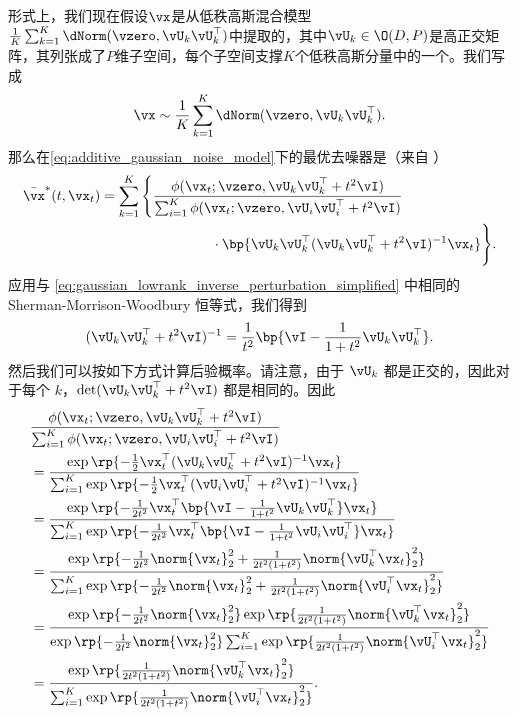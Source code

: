 \documentclass[../../book-main_zh.tex]{subfiles}
\begin{document}
形式上，我们现在假设\(\vx\)是从低秩高斯混合模型\(\frac{1}{K}\sum_{k = 1}^{K}\dNorm(\vzero,
\vU_{k}\vU_{k}^{\top})\)中提取的，其中\(\vU_{k} \in \O(D, P)\)是高正交矩阵，其列张成了\(P\)维子空间，每个子空间支撑\(K\)个低秩高斯分量中的一个。我们写成
\begin{equation}\label{eq:MoG1}
    \vx \sim \frac{1}{K}\sum_{k = 1}^{K}\dNorm(\vzero, \vU_{k}\vU_{k}^{\top}).
\end{equation}
那么在\eqref{eq:additive_gaussian_noise_model}下的最优去噪器是（来自
）
\begin{align}
    \bar{\vx}^{\ast}(t, \vx_{t})
    &= \sum_{k = 1}^{K}\Bigg\{\frac{\phi(\vx_{t} ; \vzero,
        \vU_{k}\vU_{k}^{\top} + t^{2}\vI)}{\sum_{i = 1}^{K}\phi(\vx_{t} ;
                \vzero, \vU_{i}\vU_{i}^{\top} +
        t^{2}\vI)} \\
        &\qquad \qquad \qquad \qquad
        \cdot\bp{\vU_{k}\vU_{k}^{\top}(\vU_{k}\vU_{k}^{\top} +
    t^{2}\vI)^{-1}\vx_{t}}\Bigg\}.
\end{align}
应用与 \eqref{eq:gaussian_lowrank_inverse_perturbation_simplified} 中相同的 Sherman-Morrison-Woodbury 恒等式，我们得到
\begin{equation}
    (\vU_{k}\vU_{k}^{\top} + t^{2}\vI)^{-1} = \frac{1}{t^{2}}\bp{\vI
    - \frac{1}{1 + t^{2}}\vU_{k}\vU_{k}^{\top}}.
\end{equation}
然后我们可以按如下方式计算后验概率。请注意，由于 \(\vU_{k}\) 都是正交的，因此对于每个 \(k\)，\(\det(\vU_{k}\vU_{k}^{\top}
+ t^{2}\vI)\) 都是相同的。因此
\begin{align}
    &\frac{\phi(\vx_{t} ; \vzero, \vU_{k}\vU_{k}^{\top} + t^{2}\vI)}{\sum_{i
    = 1}^{K}\phi(\vx_{t} ; \vzero, \vU_{i}\vU_{i}^{\top} + t^{2}\vI)} \\
    &= \frac{\exp\rp{-\frac{1}{2}\vx_{t}^{\top}(\vU_{k}\vU_{k}^{\top}
    + t^{2}\vI)^{-1}\vx_{t}}}{\sum_{i =
        1}^{K}\exp\rp{-\frac{1}{2}\vx_{t}^{\top}(\vU_{i}\vU_{i}^{\top} +
    t^{2}\vI)^{-1}\vx_{t}}} \\
    &= \frac{\exp\rp{-\frac{1}{2t^{2}}\vx_{t}^{\top}\bp{\vI -
    \frac{1}{1 + t^{2}}\vU_{k}\vU_{k}^{\top}}\vx_{t}}}{\sum_{i =
        1}^{K}\exp\rp{-\frac{1}{2t^{2}}\vx_{t}^{\top}\bp{\vI - \frac{1}{1
    + t^{2}}\vU_{i}\vU_{i}^{\top}}\vx_{t}}} \\
    &= \frac{\exp\rp{-\frac{1}{2t^{2}}\norm{\vx_{t}}_{2}^{2} +
            \frac{1}{2t^{2}(1 +
    t^{2})}\norm{\vU_{k}^{\top}\vx_{t}}_{2}^{2}}}{\sum_{i =
        1}^{K}\exp\rp{-\frac{1}{2t^{2}}\norm{\vx_{t}}_{2}^{2} +
    \frac{1}{2t^{2}(1 + t^{2})}\norm{\vU_{i}^{\top}\vx_{t}}_{2}^{2}}} \\
    &=
    \frac{\exp\rp{-\frac{1}{2t^{2}}\norm{\vx_{t}}_{2}^{2}}\exp\rp{\frac{1}{2t^{2}(1
                    +
    t^{2})}\norm{\vU_{k}^{\top}\vx_{t}}_{2}^{2}}}{\exp\rp{-\frac{1}{2t^{2}}\norm{\vx_{t}}_{2}^{2}}\sum_{i
        = 1}^{K}\exp\rp{\frac{1}{2t^{2}(1 +
    t^{2})}\norm{\vU_{i}^{\top}\vx_{t}}_{2}^{2}}} \\
    &= \frac{\exp\rp{\frac{1}{2t^{2}(1 +
    t^{2})}\norm{\vU_{k}^{\top}\vx_{t}}_{2}^{2}}}{\sum_{i =
        1}^{K}\exp\rp{\frac{1}{2t^{2}(1 +
    t^{2})}\norm{\vU_{i}^{\top}\vx_{t}}_{2}^{2}}}.
\end{align}
\end{document}
